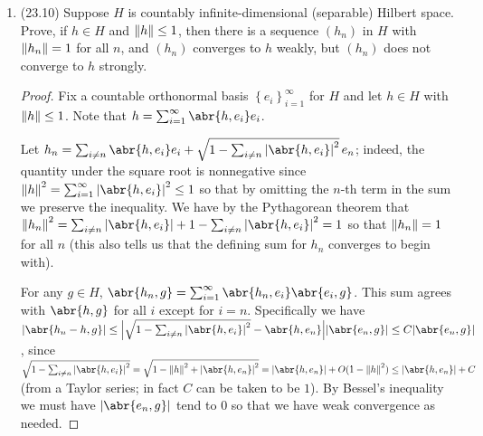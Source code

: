 \documentclass[11pt]{article}
\newcommand{\cbr}[1]{\left\{#1\right\}}
\begin{document}
\begin{enumerate}
\begin{enumerate}
\begin{proof}
        Conversely, let $\varepsilon$ be given. Then choose $N$ large enough so that $\abs{\abr{h_n-h,h}}<\varepsilon$ (so $-\Re\abr{h_n,h}<\varepsilon -\Re\abr{h,h}$) and $\abs{\norm{h_n}-\norm{h}}\leq \varepsilon$. Then for $n\geq N$, we have $\norm{h_n-h}^2 = \abr{h_n-h,h_n-h} = \norm{h_n}^2 + \norm{h}^2 - 2\Re\abr{h_n,h}\leq \norm{h_n}^2 + \norm{h}^2 - 2\Re\abr{h,h} + \varepsilon = \norm{h_n}^2 - \norm{h}^2 + \varepsilon\leq 2\varepsilon$. Hence $\norm{h_n-h}$ tends to zero as needed.
      \end{proof}
      \item Prove if $(h_n)$ converges to $h$ weakly, then $\norm{h}\leq \liminf\norm{h_n}$. \begin{proof}
        By Cauchy-Schwarz we have $\abs{\abr{h_n,h/\norm{h}}}\leq \norm{h_n}$. By taking $\liminf$ on both sides (as the inequality is preserved) and using the fact that $\lim \abs{\abr{h_n,h/\norm{h}}}$ exists and is equal to $\abr{h,h/\norm{h}} = \norm{h}$ (since norms are continuous and $h_n$ converges weakly to $h$) we have $\norm{h} = \lim \abs{\abr{h_n,h/\norm{h}}} = \liminf \abs{\abr{h_n,h/\norm{h}}}\leq \liminf\norm{h_n}$.
      \end{proof}
    \end{enumerate}
    \item (23.10) Suppose $H$ is countably infinite-dimensional (separable) Hilbert space. Prove, if $h\in H$ and $\norm{h}\leq 1$, then there is a sequence $(h_n)$ in $H$ with $\norm{h_n}=1$ for all $n$, and $(h_n)$ converges to $h$ weakly, but $(h_n)$ does not converge to $h$ strongly. \begin{proof}
      Fix a countable orthonormal basis $\cbr{e_i}_{i=1}^\infty$ for $H$ and let $h\in H$ with $\norm{h}\leq 1$. Note that $h = \sum_{i=1}^\infty \abr{h,e_i}e_i$.
      
      Let $h_n = \sum_{i\neq n}\abr{h,e_i}e_i + \sqrt{1-\sum_{i\neq n}\abs{\abr{h,e_i}}^2}\,e_n$; indeed, the quantity under the square root is nonnegative since $\norm{h}^2 = \sum_{i=1}^\infty \abs{\abr{h,e_i}}^2\leq 1$ so that by omitting the $n$-th term in the sum we preserve the inequality. We have by the Pythagorean theorem that $\norm{h_n}^2 = \sum_{i\neq n}\abs{\abr{h,e_i}} + 1-\sum_{i\neq n}\abs{\abr{h,e_i}}^2 = 1$ so that $\norm{h_n} = 1$ for all $n$ (this also tells us that the defining sum for $h_n$ converges to begin with).

      For any $g\in H$, $\abr{h_n,g} = \sum_{i=1}^\infty\abr{h_n,e_i}\abr{e_i,g}$. This sum agrees with $\abr{h,g}$ for all $i$ except for $i=n$. Specifically we have $\abs{\abr{h_n-h,g}}\leq \abs{\sqrt{1-\sum_{i\neq n}\abs{\abr{h,e_i}}^2}-\abr{h,e_n}}\abs{\abr{e_n,g}}\leq C\abs{\abr{e_n,g}}$, since $\sqrt{1-\sum_{i\neq n}\abs{\abr{h,e_i}}^2} = \sqrt{1-\norm{h}^2+\abs{\abr{h,e_n}}^2} = \abs{\abr{h,e_n}} + O(1-\norm{h}^2)\leq \abs{\abr{h,e_n}} + C$ (from a Taylor series; in fact $C$ can be taken to be $1$). By Bessel's inequality we must have $\abs{\abr{e_n,g}}$ tend to $0$ so that we have weak convergence as needed.


\end{proof}
\end{enumerate}
\end{document}
